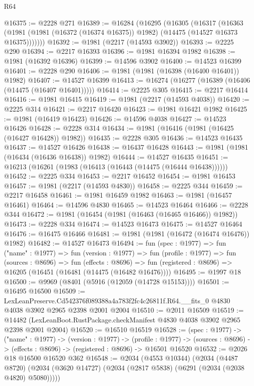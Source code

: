 \begin{lexlean}{R64}
\begin{coremodule}
@16375 := @2228 @271
@16389 := @16284
    (@16295
      (@16305
        (@16317
          (@16363 (@1981 (@1981 (@16372 (@16374 @16375)) @1982) (@14475 (@14527 @16373 @16375)))))))
@16392 := @1981 (@2217 (@14593 @3902))
@16393 := @2225 @290
@16394 := @2217 @16393
@16396 := @1981 @16394 @1982
@16398 := @1981 (@16392 @16396)
@16399 := @14596 @3902
@16400 := @14523 @16399
@16401 := @2228 @290
@16406 := @1981 (@1981 (@16398 (@16400 @16401)) @1982)
@16407 := @14527 @16399
@16413 := @16274 (@16277 (@16389 (@16406 (@14475 (@16407 @16401)))))
@16414 := @2225 @305
@16415 := @2217 @16414
@16416 := @1981 @16415
@16419 := @1981 (@2217 (@14593 @4038))
@16420 := @2225 @314
@16421 := @2217 @16420
@16423 := @1981 @16421 @1982
@16425 := @1981 (@16419 @16423)
@16426 := @14596 @4038
@16427 := @14523 @16426
@16428 := @2228 @314
@16434 := @1981 (@16416 (@1981 (@16425 (@16427 @16428)) @1982))
@16435 := @2228 @305
@16436 := @14523 @16435
@16437 := @14527 @16426
@16438 := @16437 @16428
@16443 := @1981 (@1981 (@16434 (@16436 @16438)) @1982)
@16444 := @14527 @16435
@16451 := @16213 (@16261 (@1983 (@16413 (@16443 (@14475 (@16444 @16438))))))
@16452 := @2225 @334
@16453 := @2217 @16452
@16454 := @1981 @16453
@16457 := @1981 (@2217 (@14593 @4830))
@16458 := @2225 @344
@16459 := @2217 @16458
@16461 := @1981 @16459 @1982
@16463 := @1981 (@16457 @16461)
@16464 := @14596 @4830
@16465 := @14523 @16464
@16466 := @2228 @344
@16472 := @1981 (@16454 (@1981 (@16463 (@16465 @16466)) @1982))
@16473 := @2228 @334
@16474 := @14523 @16473
@16475 := @14527 @16464
@16476 := @16475 @16466
@16481 := @1981 (@1981 (@16472 (@16474 @16476)) @1982)
@16482 := @14527 @16473
@16494 := fun (spec : @1977) =>
  fun ("name" : @1977) =>
  fun (version : @1977) =>
  fun (profile : @1977) =>
  fun (sources : @8696) =>
  fun (effects : @8696) =>
  fun (registered : @8696) => @16205 (@16451 (@16481 (@14475 (@16482 @16476))))
@16495 := @1997 @18
@16500 := @9969 (@8401 (@5916 (@12059 (@14728 @15153))))
@16501 := @16495 @16500
@16509 := LexLeanPreserve.Cd542376f089388a4a783f2fc4c26811f.R64.__fits_0
    @4830
    @4038
    @3902
    @2965
    @2398
    @2001
    @2004
@16510 := @2011 @16509
@16519 := @14482 (LexLeanBoot.RustPackage.checkManifest @4830 @4038 @3902 @2965 @2398 @2001 @2004)
@16520 := @16510 @16519
@16528 := (spec : @1977) ->
  ("name" : @1977) ->
  (version : @1977) ->
  (profile : @1977) ->
  (sources : @8696) -> (effects : @8696) -> (registered : @8696) -> @16501 @16520
@16532 := @2026 @18 @16500 @16520 @362
@16548 := @2034
    (@4553 @10344)
    (@2034
      (@4487 @8720)
      (@2034 (@3620 @14727) (@2034 (@2817 @5838) (@6291 (@2034 (@2038 @4820) @5080)))))

\end{coremodule}
\end{lexlean}
